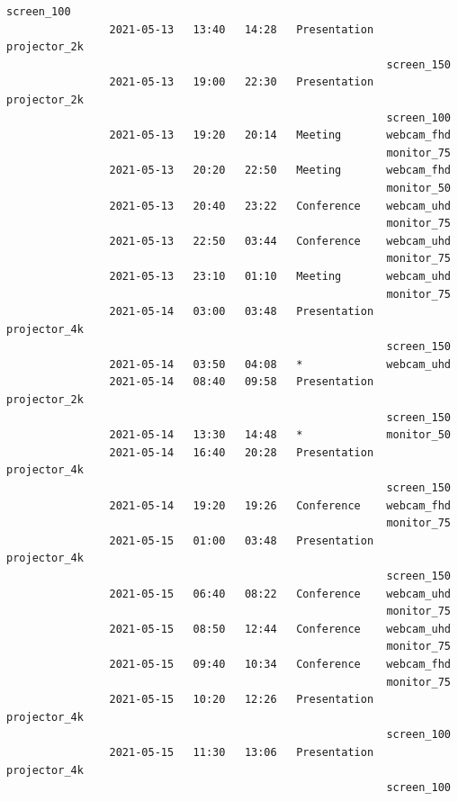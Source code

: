 \documentclass{article}
\begin{document}
\begin{Verbatim}[gobble=8]
                                                           screen_100
                2021-05-13   13:40   14:28   Presentation  projector_2k
                                                           screen_150
                2021-05-13   19:00   22:30   Presentation  projector_2k
                                                           screen_100
                2021-05-13   19:20   20:14   Meeting       webcam_fhd
                                                           monitor_75
                2021-05-13   20:20   22:50   Meeting       webcam_fhd
                                                           monitor_50
                2021-05-13   20:40   23:22   Conference    webcam_uhd
                                                           monitor_75
                2021-05-13   22:50   03:44   Conference    webcam_uhd
                                                           monitor_75
                2021-05-13   23:10   01:10   Meeting       webcam_uhd
                                                           monitor_75
                2021-05-14   03:00   03:48   Presentation  projector_4k
                                                           screen_150
                2021-05-14   03:50   04:08   *             webcam_uhd
                2021-05-14   08:40   09:58   Presentation  projector_2k
                                                           screen_150
                2021-05-14   13:30   14:48   *             monitor_50
                2021-05-14   16:40   20:28   Presentation  projector_4k
                                                           screen_150
                2021-05-14   19:20   19:26   Conference    webcam_fhd
                                                           monitor_75
                2021-05-15   01:00   03:48   Presentation  projector_4k
                                                           screen_150
                2021-05-15   06:40   08:22   Conference    webcam_uhd
                                                           monitor_75
                2021-05-15   08:50   12:44   Conference    webcam_uhd
                                                           monitor_75
                2021-05-15   09:40   10:34   Conference    webcam_fhd
                                                           monitor_75
                2021-05-15   10:20   12:26   Presentation  projector_4k
                                                           screen_100
                2021-05-15   11:30   13:06   Presentation  projector_4k
                                                           screen_100

\end{Verbatim}
\end{document}
